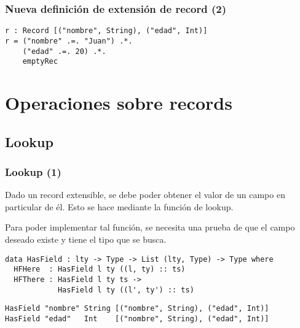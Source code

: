\documentclass{beamer}
\begin{document}
\begin{frame}[fragile]
\frametitle{Nueva definición de extensión de record (2)}

\begin{example}
\begin{verbatim}
r : Record [("nombre", String), ("edad", Int)]
r = ("nombre" .=. "Juan") .*.
    ("edad" .=. 20) .*.
    emptyRec
\end{verbatim}
\end{example}

\end{frame}

\section{Operaciones sobre records}

\subsection{Lookup}

\begin{frame}[fragile]
\frametitle{Lookup (1)}

Dado un record extensible, se debe poder obtener el valor de un campo en particular de él. Esto se hace mediante la función de lookup.

Para poder implementar tal función, se necesita una prueba de que el campo deseado existe y tiene el tipo que se busca.

\pause

\begin{example}
\begin{verbatim}
data HasField : lty -> Type -> List (lty, Type) -> Type where
  HFHere  : HasField l ty ((l, ty) :: ts)
  HFThere : HasField l ty ts -> 
            HasField l ty ((l', ty') :: ts)
\end{verbatim}
\end{example}

\pause

\begin{example}[Ejemplos]
\begin{verbatim}
HasField "nombre" String [("nombre", String), ("edad", Int)]
HasField "edad"   Int    [("nombre", String), ("edad", Int)]
\end{verbatim}
\end{example}

\end{frame}
\end{document}
